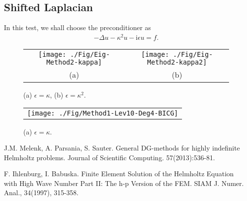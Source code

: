 \documentclass[preprint,11pt]{elsarticle}
\begin{document}
\subsection{Shifted Laplacian}
In this test, we shall choose the preconditioner as
\begin{eqnarray*}
-\Delta u - \kappa^2 u -\text{i}\epsilon u = f.
\end{eqnarray*}

\begin{figure}[H]
\centering
\begin{tabular}{cc}
\texttt{[image: ./Fig/Eig-Method2-kappa]}
&
\texttt{[image: ./Fig/Eig-Method2-kappa2]}\\
(a) & (b)
\end{tabular}
\caption{(a) $\epsilon = \kappa$, (b) $\epsilon = \kappa^2$.}\label{Fig:Ex3-1}
\end{figure}

\begin{figure}[H]
\centering
\begin{tabular}{c}
\texttt{[image: ./Fig/Method1-Lev10-Deg4-BICG]}
\end{tabular}
\caption{(a) $\epsilon = \kappa$.}\label{Fig:Ex3-2}
\end{figure}



\begin{thebibliography}{00}

J.M. Melenk, A. Parsania, S. Sauter. General DG-methods for highly indefinite Helmholtz problems. Journal of Scientific Computing. 57(2013):536-81.

F. Ihlenburg, I. Babuska.
Finite Element Solution of the Helmholtz Equation with High Wave Number Part II: The h-p Version of the FEM. SIAM J. Numer. Anal., 34(1997), 315-358.


\end{thebibliography}
\end{document}
